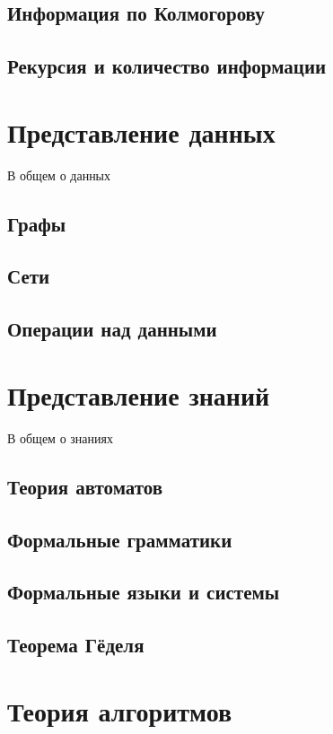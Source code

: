 \documentclass[b5paper,11pt]{book}
\begin{document}
	\section{Информация по Колмогорову}
	\section{Рекурсия и количество информации}
	
	
	\chapter{Представление данных}
	В общем о данных
	
	\section{Графы}
	
	\section{Сети}
	
	\section{Операции над данными}
	
	\chapter{Представление знаний}
	В общем о знаниях
	
	\section{Теория автоматов}
	\section{Формальные грамматики}
	\section{Формальные языки и системы}
	\section{Теорема Гёделя}
	
	\chapter{Теория алгоритмов}
	
\end{document}
